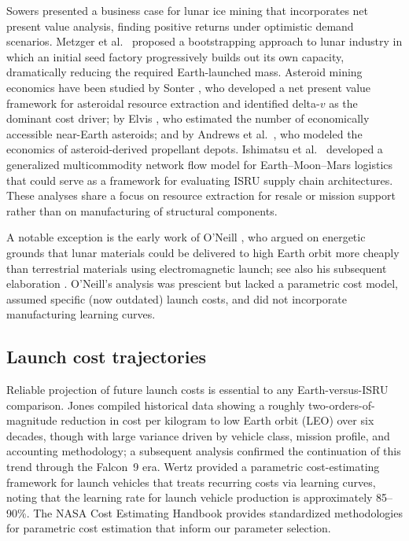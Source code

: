 \documentclass[preprint,12pt]{elsarticle}
\begin{document}
Sowers \cite{sowers2021} presented a business case for lunar ice mining that incorporates net present value analysis, finding positive returns under optimistic demand scenarios. Metzger et al.\ \cite{metzger2013} proposed a bootstrapping approach to lunar industry in which an initial seed factory progressively builds out its own capacity, dramatically reducing the required Earth-launched mass. Asteroid mining economics have been studied by Sonter \cite{sonter1997}, who developed a net present value framework for asteroidal resource extraction and identified delta-$v$ as the dominant cost driver; by Elvis \cite{elvis2012}, who estimated the number of economically accessible near-Earth asteroids; and by Andrews et al.\ \cite{andrews2015}, who modeled the economics of asteroid-derived propellant depots. Ishimatsu et al.\ \cite{ishimatsu2016} developed a generalized multicommodity network flow model for Earth--Moon--Mars logistics that could serve as a framework for evaluating ISRU supply chain architectures. These analyses share a focus on resource extraction for resale or mission support rather than on manufacturing of structural components.

A notable exception is the early work of O'Neill \cite{oneill1974}, who argued on energetic grounds that lunar materials could be delivered to high Earth orbit more cheaply than terrestrial materials using electromagnetic launch; see also his subsequent elaboration \cite{oneill1976}. O'Neill's analysis was prescient but lacked a parametric cost model, assumed specific (now outdated) launch costs, and did not incorporate manufacturing learning curves.

\subsection{Launch cost trajectories}

Reliable projection of future launch costs is essential to any Earth-versus-ISRU comparison. Jones \cite{jones2018} compiled historical data showing a roughly two-orders-of-magnitude reduction in cost per kilogram to low Earth orbit (LEO) over six decades, though with large variance driven by vehicle class, mission profile, and accounting methodology; a subsequent analysis \cite{jones2020} confirmed the continuation of this trend through the Falcon~9 era. Wertz \cite{wertz2011} provided a parametric cost-estimating framework for launch vehicles that treats recurring costs via learning curves, noting that the learning rate for launch vehicle production is approximately 85--90\%. The NASA Cost Estimating Handbook \cite{nasa2015handbook} provides standardized methodologies for parametric cost estimation that inform our parameter selection.
\end{document}
